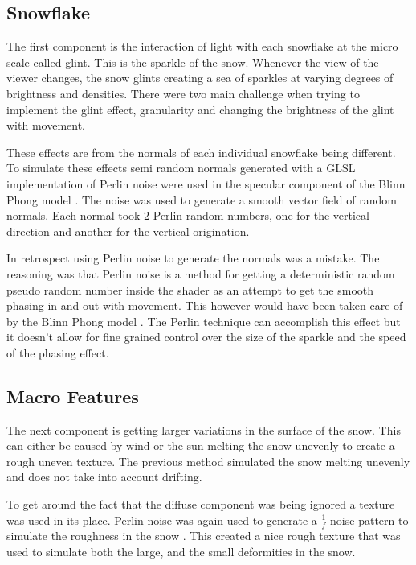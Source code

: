 \documentclass{IEEEtran}
\begin{document}
\subsection{Snowflake}
The first component is the interaction of light with each snowflake at the micro
scale called glint. This is the sparkle of the snow. Whenever the view of the
viewer changes, the snow glints creating a sea of sparkles at varying degrees of
brightness and densities.  There were two main challenge when trying to
implement the glint effect, granularity and changing the brightness of the glint
with movement.

These effects are from the normals of each individual snowflake being different.
To simulate these effects semi random normals generated with a GLSL
implementation \cite{noiseglsl} of Perlin noise
\cite{wiki:perlin} were used in the specular component of the Blinn Phong model
\cite{blinn1977models}. The noise was used to generate a smooth vector field of
random normals. Each normal took 2 Perlin random numbers, one for
the vertical direction and another for the vertical origination.

In retrospect using Perlin noise to generate the normals was a mistake. The
reasoning was that Perlin noise is a method for getting a deterministic random
pseudo random number inside the shader as an attempt to get the smooth phasing
in and out with movement. This however would have been taken care of by the
Blinn Phong model \cite{blinn1977models}. The Perlin technique can accomplish
this effect but it doesn't allow for fine grained control over the size of the
sparkle and the speed of the phasing effect.

\subsection{Macro Features}

The next component is getting larger variations in the surface of the snow.
This can either be caused by wind or the sun melting the snow unevenly to create
a rough uneven texture. The previous method simulated the snow melting unevenly and
does not take into account drifting.

To get around the fact that the diffuse component was being ignored a texture
was used in its place. Perlin noise was again used to generate a \(\frac{1}{f}\) noise
pattern to simulate the roughness in the snow .  This created a
nice rough texture that was used to simulate both the large, and the small
deformities in the snow.
\end{document}
